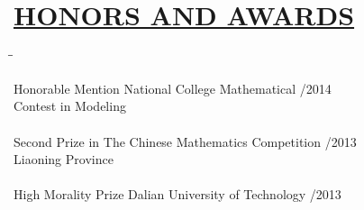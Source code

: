 \documentclass{res} %
\begin{document}
\begin{resume}
\begin{tabbing}
   \end{tabbing}\vspace{-22pt}      %
\vspace{-0.1in}
\section{\underline{HONORS AND AWARDS}}
   \vspace{-0.02in}		
   \begin{tabbing}
   \hspace{2.2in}\= \hspace{2.8in}\= \kill %

   Honorable Mention           \>National College Mathematical 		/2014\\
                                \>Contest in Modeling \\ \\
   Second Prize in \>The Chinese Mathematics Competition /2013 \\
   Liaoning Province \\\\
   High Morality Prize     \>Dalian University of Technology  /2013\\
  
    \end{tabbing}\vspace{-22pt}      %
\end{resume}
\end{document}
